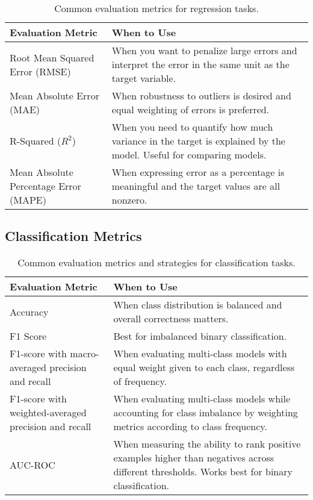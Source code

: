 \documentclass[12pt,openany]{book}
\begin{document}
\begin{table}[H]
    \centering
    \small
    \renewcommand{\arraystretch}{1.3}
    \begin{tabular}{|l|p{9cm}|}
        \hline
        \textbf{Evaluation Metric} & \textbf{When to Use} \\
        \hline
        Root Mean Squared Error (RMSE) & When you want to penalize large errors and interpret the error in the same unit as the target variable. \\
        \hline
        Mean Absolute Error (MAE) & When robustness to outliers is desired and equal weighting of errors is preferred. \\
        \hline
        R-Squared (\( R^2 \)) & When you need to quantify how much variance in the target is explained by the model. Useful for comparing models. \\
        \hline
        Mean Absolute Percentage Error (MAPE) & When expressing error as a percentage is meaningful and the target values are all nonzero. \\
        \hline
    \end{tabular}
    \caption{Common evaluation metrics for regression tasks.}
\end{table}

\subsection{Classification Metrics}

\begin{table}[H]
    \centering
    \small
    \renewcommand{\arraystretch}{1.3}
    \begin{tabular}{|l|p{9cm}|}
        \hline
        \textbf{Evaluation Metric} & \textbf{When to Use} \\
        \hline
        Accuracy & When class distribution is balanced and overall correctness matters. \\
        \hline
        F1 Score & Best for 
        imbalanced binary classification. \\
        \hline
        F1-score with macro-averaged precision and recall & When evaluating multi-class models with equal weight 
        given to each class, regardless of frequency. \\
        \hline
        F1-score with weighted-averaged precision and recall & When evaluating multi-class models while accounting 
        for class imbalance by weighting metrics according to class frequency. \\
        \hline
        AUC-ROC & When measuring the ability to rank positive examples higher than 
        negatives across different thresholds. Works best for binary classification. \\
        \hline
    \end{tabular}
    \caption{Common evaluation metrics and strategies for classification tasks.}
\end{table}
\end{document}
